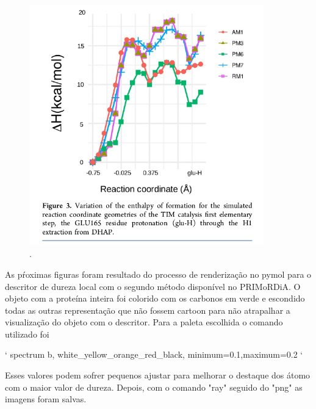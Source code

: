 \documentclass[a4paper,11pt]{refart}
\begin{document}
\hspace*{-\leftmarginwidth}
\begin{minipage}{\fullwidth}
	\begin{figure}[H]
		\begin{center}
			\includegraphics[width=4in]{images/tut6_img6}
			\caption{.}
			\label{fig_tut6_5}
		\end{center}
	\end{figure}
\end{minipage}

As pŕoximas figuras foram resultado do processo de renderização no pymol para o descritor de dureza local com o segundo método disponível no PRIMoRDiA. O objeto com a proteína inteira foi colorido com os carbonos em verde e escondido todas as outras representação que não fossem cartoon para não atrapalhar a visualização do objeto com o descritor. Para a paleta escolhida o comando utilizado foi 

` spectrum b, white_yellow_orange_red_black, minimum=0.1,maximum=0.2 `

Esses valores podem sofrer pequenos ajustar para melhorar o destaque dos átomo com o maior valor de dureza. Depois, com o comando "ray" seguido do "png" as imagens foram salvas. 
\end{document}
